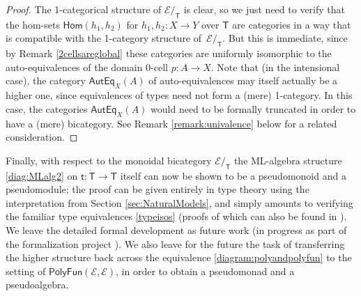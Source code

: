 \documentclass[12pt,reqno]{amsart}
\newcommand{\EE}{\ensuremath{\mathcal{E}}}
\newcommand{\Hom}{\ensuremath{\mathsf{Hom}}}
\renewcommand{\to}{\ensuremath{\rightarrow}}
\renewcommand{\t}{\ensuremath{\mathsf{t}}}
\newcommand{\T}{\ensuremath{\mathsf{T}}}
\newcommand{\TT}{\ensuremath{\dot{\mathsf{T}}}}
\theoremstyle{remark}
\theoremstyle{definition}
\begin{document}
\begin{proof}
The 1-categorical structure of $\EE/_\T$ is clear, so we just need to verify that the hom-sets $\Hom(h_1, h_2)$ for $h_1, h_2 : X \to Y$ over $\T$  are categories in a way that is compatible with the 1-category structure of~$\EE/_\T$.  But this is immediate, since by Remark \ref{2cellsareglobal} these categories are uniformly isomorphic to the auto-equivalences of the domain 0-cell $p: A\to X$.  Note that (in the intensional case), the category $\mathsf{AutEq}_X(A)$ of auto-equivalences may itself actually be a higher one, since equivalences of types need not form a (mere) 1-category. In this case, the categories $\mathsf{AutEq}_X(A)$ would need to be formally truncated in order to have a (mere) bicategory.  See Remark \ref{remark:univalence} below for a related consideration.
\end{proof}

Finally, with respect to the monoidal bicategory $\EE/_\T$ the ML-algebra structure \eqref{diag:MLalg2} on $\t : \TT\to\T$ itself can now be shown to be a pseudomonoid and a pseudomodule; the proof can be given entirely in type theory using the interpretation from Section \ref{sec:NaturalModels}, and simply amounts to verifying the familiar type equivalences \eqref{typeisos} (proofs of which can also be found in \cite[Chapter 2]{HoTTbook}).  We leave the detailed formal development as future work (in progress as part of the formalization project \cite{HoTTLean}).  We also leave for the future the task of transferring the higher structure back across the equivalence \eqref{diagram:polyandpolyfun} to the setting of $\mathsf{PolyFun}(\EE, \EE)$, in order to obtain a pseudomonad and a pseudoalgebra.
\end{document}
